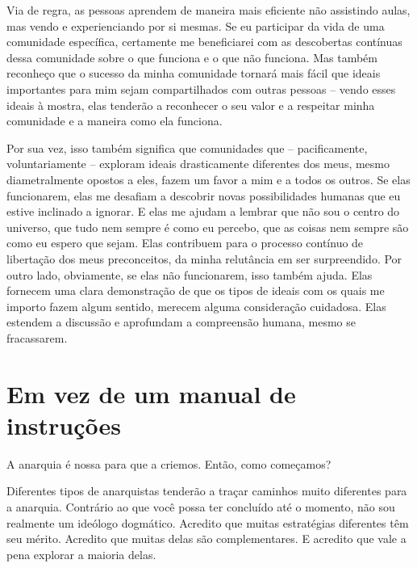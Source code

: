 Via de regra, as pessoas aprendem de maneira mais eficiente não assistindo aulas, mas vendo e experienciando por si mesmas. Se eu participar da vida de uma comunidade específica, certamente me beneficiarei com as descobertas contínuas dessa comunidade sobre o que funciona e o que não funciona. Mas também reconheço que o sucesso da minha comunidade tornará mais fácil que ideais importantes para mim sejam compartilhados com outras pessoas -- vendo esses ideais à mostra, elas tenderão a reconhecer o seu valor e a respeitar minha comunidade e a maneira como ela funciona.

Por sua vez, isso também significa que comunidades que -- pacificamente, voluntariamente -- exploram ideais drasticamente diferentes dos meus, mesmo diametralmente opostos a eles, fazem um favor a mim e a todos os outros. Se elas funcionarem, elas me desafiam a descobrir novas possibilidades humanas que eu estive inclinado a ignorar. E elas me ajudam a lembrar que não sou o centro do universo, que tudo nem sempre é como eu percebo, que as coisas nem sempre são como eu espero que sejam. Elas contribuem para o processo contínuo de libertação dos meus preconceitos, da minha relutância em ser surpreendido. Por outro lado, obviamente, se elas não funcionarem, isso também ajuda. Elas fornecem uma clara demonstração de que os tipos de ideais com os quais me importo fazem algum sentido, merecem alguma consideração cuidadosa. Elas estendem a discussão e aprofundam a compreensão humana, mesmo se fracassarem.

\section{Em vez de um manual de instruções}

A anarquia é nossa para que a criemos. Então, como começamos?

Diferentes tipos de anarquistas tenderão a traçar caminhos muito diferentes para a anarquia. Contrário ao que você possa ter concluído até o momento, não sou realmente um ideólogo dogmático. Acredito que muitas estratégias diferentes têm seu mérito. Acredito que muitas delas são complementares. E acredito que vale a pena explorar a maioria delas.

